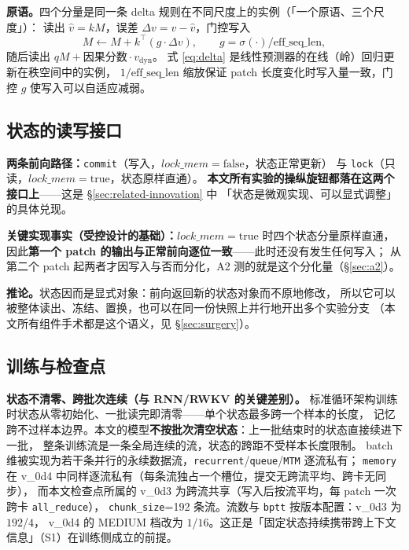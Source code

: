 \textbf{原语。}四个分量是同一条 delta 规则在不同尺度上的实例（「一个原语、三个尺度」）：
读出 $\hat v = kM$，误差 $\Delta v = v - \hat v$，门控写入
\begin{equation}
M \leftarrow M + k^{\top}\!\left(g \cdot \Delta v\right),
\qquad g = \sigma(\cdot)\big/ \mathrm{eff\_seq\_len},
\label{eq:delta}
\end{equation}
随后读出 $qM + \text{因果分数} \cdot v_{\mathrm{dyn}}$。
式 \eqref{eq:delta} 是线性预测器的在线（岭）回归更新在秩空间中的实例，
$1/\mathrm{eff\_seq\_len}$ 缩放保证 patch 长度变化时写入量一致，门控 $g$ 使写入可以自适应减弱。

\subsection{状态的读写接口}\label{sec:model-io}

\textbf{两条前向路径：}\texttt{commit}（写入，$\mathit{lock\_mem}=\mathrm{false}$，状态正常更新）
与 \texttt{lock}（只读，$\mathit{lock\_mem}=\mathrm{true}$，状态原样直通）。
\textbf{本文所有实验的操纵旋钮都落在这两个接口上}——这是 \S\ref{sec:related-innovation} 中
「状态是微观实现、可以显式调整」的具体兑现。

\textbf{关键实现事实（受控设计的基础）：}$\mathit{lock\_mem}=\mathrm{true}$ 时四个状态分量原样直通，
因此\textbf{第一个 patch 的输出与正常前向逐位一致}——此时还没有发生任何写入；
从第二个 patch 起两者才因写入与否而分化，A2 测的就是这个分化量（\S\ref{sec:a2}）。

\textbf{推论。}状态因而是显式对象：前向返回新的状态对象而不原地修改，
所以它可以被整体读出、冻结、置换，也可以在同一份快照上并行地开出多个实验分支
（本文所有组件手术都是这个语义，见 \S\ref{sec:surgery}）。

\subsection{训练与检查点}\label{sec:train}

\textbf{状态不清零、跨批次连续（与 RNN/RWKV 的关键差别）。}
标准循环架构训练时状态从零初始化、一批读完即清零——单个状态最多跨一个样本的长度，
记忆跨不过样本边界。本文的模型\textbf{不按批次清空状态}：上一批结束时的状态直接续进下一批，
整条训练流是一条全局连续的流，状态的跨距不受样本长度限制。
batch 维被实现为若干条并行的永续数据流，\texttt{recurrent}/\texttt{queue}/\texttt{MTM} 逐流私有；
\texttt{memory} 在 v\_0d4 中同样逐流私有（每条流独占一个槽位，提交无跨流平均、跨卡无同步），
而本文检查点所属的 v\_0d3 为跨流共享（写入后按流平均，每 patch 一次跨卡 \texttt{all\_reduce}），
\texttt{chunk\_size}=192 条流。流数与 \texttt{bptt} 按版本配置：v\_0d3 为 $192$/$4$，
v\_0d4 的 MEDIUM 档改为 $1$/$16$。这正是「固定状态持续携带跨上下文信息」（S1）在训练侧成立的前提。

